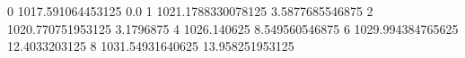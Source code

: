 0 1017.591064453125 0.0
1 1021.1788330078125 3.5877685546875
2 1020.770751953125 3.1796875
4 1026.140625 8.549560546875
6 1029.994384765625 12.4033203125
8 1031.54931640625 13.958251953125
